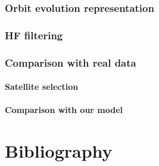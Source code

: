 \documentclass[11pt,a4paper]{report}
\begin{document}
\section{Orbit evolution representation}
\section{HF filtering}
\section{Comparison with real data}
\subsection{Satellite selection}
\subsection{Comparison with our model}
\part{Bibliography}

%
%
%
\end{document}
